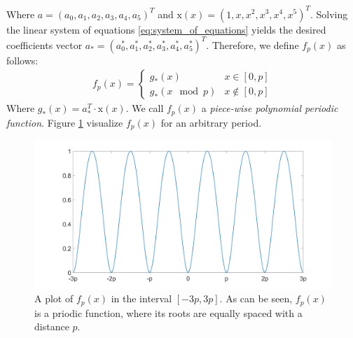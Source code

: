 Where $a = \left(a_0,a_1,a_2,a_3,a_4,a_5\right)^T$ and $\mathrm{x}\left(x\right) = \left(1,x,x^2,x^3,x^4,x^5\right)^T$.
Solving the linear system of equations \ref{eq:system_of_equations} yields the desired coefficients vector $a_* = \left(a^*_0,a^*_1,a^*_2,a^*_3,a^*_4,a^*_5\right)^T$. Therefore, we define $f_p\left(x\right)$ as follows:
\begin{equation}\label{eq:polynomial_6}
\begin{split}
f_p\left(x\right) = 
\begin{cases} 
  g_*\left(x\right) & x \in \left[0,p\right] \\
  g_*\left(x \mod{p}\right) & x \notin \left[0,p\right]
\end{cases}
\end{split}
\end{equation}
Where $g_*\left(x\right) = a_*^T \cdot \mathrm{x}\left(x\right)$. We call $f_p\left(x\right)$ a \emph{piece-wise polynomial periodic function}. Figure \ref{fig:polynomial_periodic_function} visualize $f_p\left(x\right)$ for an arbitrary period.
\begin{figure}[ht]
\centering
\includegraphics[width=12cm]{figures/periodic_function.png}
\caption[Piece-wise Polynomial Periodic Function]{A plot of $f_p\left(x\right)$ in the interval $\left[-3p, 3p\right]$. As can be seen, $f_p\left(x\right)$ is a priodic function, where its roots are equally spaced with a distance $p$.}
\label{fig:polynomial_periodic_function}
\end{figure}

